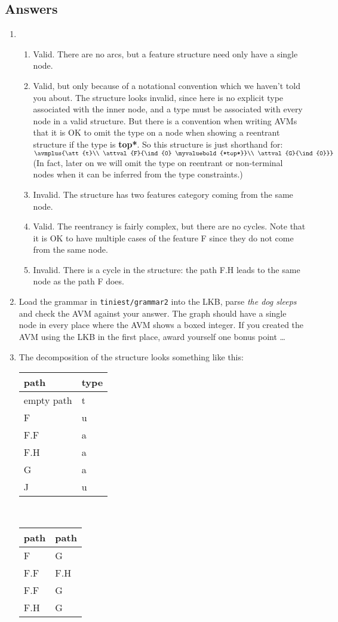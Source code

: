 \documentclass[12pt]{report}
\begin{document}
\subsection{Answers}
\begin{enumerate}
\item 
\begin{enumerate}
\item Valid.  There are no arcs, but a feature structure
need only have a single node.
\item Valid, but only because
of a notational convention which we haven't told
you about.  The structure looks invalid, since here is
no explicit type associated with the inner node, and a type
must be associated with every node in a valid
structure.  But there is a convention
when writing AVMs that it is OK to omit the type on a node
when showing a reentrant structure if the type is {\bf *top*}.
So this structure is just shorthand for:\\
{\tiny $\avmplus{\att{t}\\
\attval{F}{\ind{0} \myvaluebold{*top*}}\\
\attval{G}{\ind{0}}}$}\\
(In fact, later on we will omit the type 
on reentrant or non-terminal nodes when it
can be inferred from the type constraints.)
\item Invalid.  The structure has two features {\sc category}
coming from the same node.
\item Valid. The reentrancy is fairly complex, but there are no cycles.
Note that it is OK to have multiple cases of the feature F
since they do not come from the same node.
\item Invalid. There is a cycle in the structure:
the path F.H leads to the same node as the path F does.
\end{enumerate}
\item Load the grammar in {\tt tiniest/grammar2} into the LKB, parse {\it the dog
sleeps} and check the AVM against your answer.
The graph should have a single node in every place where the AVM
shows a boxed integer.  
If you created 
the AVM using the LKB in the first place, award yourself
one bonus point \ldots  
\item The decomposition of the structure looks something like this:\\
\begin{tabular}{ll}
path & type\\ \hline
empty path   & t\\
F            & u\\ 
F.F          & a\\
F.H           & a\\
G     &     a\\
J     &     u
\end{tabular}\\[0.1in]
\begin{tabular}{ll}
path & path\\ \hline
F  &  G\\
F.F &  F.H\\
F.F & G\\
F.H & G
\end{tabular}


\end{enumerate}
\end{document}
